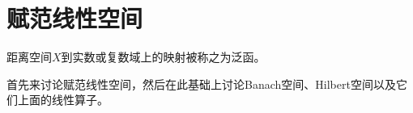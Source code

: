 \chapter{赋范线性空间}

距离空间$X$到实数或复数域上的映射被称之为泛函。

首先来讨论赋范线性空间，然后在此基础上讨论Banach空间、Hilbert空间以及它们上面的线性算子。
















